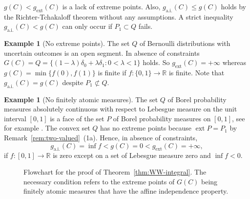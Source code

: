 \documentclass[a4paper,11pt,reqno]{amsart}
\numberwithin{equation}{section}
\theoremstyle{plain}
\theoremstyle{definition}
\newtheorem{example}[theorem]{Example}
\newcommand{\R}{\mathbb{R}} %
\DeclareMathOperator{\ext}{ext} %
\newcommand\ait{\mathrm{a.i.}}
\newcommand\extt{\mathrm{ext}}
\newcommand\fint{\mathrm{fin}}
\begin{document}
$g(C)<g_\extt(C)$ is a lack of extreme points. Also, $g_\ait(C)\leq g(C)$ 
holds by the Richter-Tchakaloff theorem without any assumptions. 
A strict inequality $g_\ait(C)<g(C)$ can only occur if $P_1\subset Q$ fails.
\par
%
\begin{example}[No extreme points]
The set $Q$ of Bernoulli distributions with uncertain outcomes is an open segment. 
In absence of constraints 
$G(C)=Q=\{(1-\lambda)\delta_0+\lambda\delta_1:0<\lambda<1\}$ holds. 
So $g_\extt(C)=+\infty$ whereas $g(C)=\min\{f(0),f(1)\}$ is finite if 
$f\colon\{0,1\}\to\R$ is finite. Note that $g_\ait(C)=g(C)$ despite $P_1\not\subset Q$.
\end{example}
%
\begin{example}[No finitely atomic measures]
The set $Q$ of Borel probability measures absolutely continuous with respect to  
Lebesgue measure on the unit interval $[0,1]$ is a face of the set $P$ of Borel 
probability measures on $[0,1]$, see for example \cite[Lemma 9.1]{weis25}. The 
convex set $Q$ has no extreme points because $\ext P=P_1$ by 
Remark~\ref{rem:two-valued}~(1a). Hence, in absence of constraints,
\[
g_\ait(C)=\inf f<g(C)=0<g_\extt(C)=+\infty,
\]
if $f\colon[0,1]\to\R$ is zero except on a set of Lebesgue measure zero and 
$\inf f<0$.
\end{example}
%
\begin{figure}
\hfill
{}%
\hspace*{\fill}
\caption{\label{fig:flowchart1}%
Flowchart for the proof of Theorem~\ref{thm:WW-integral}.
The necessary condition refers to the extreme points of $G(C)$
being finitely atomic measures that have the affine independence
property.}
\end{figure}
\end{document}
